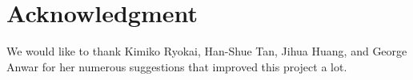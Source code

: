 \section{Acknowledgment}\label{sec:ack}
We would like to thank Kimiko Ryokai, Han-Shue Tan, Jihua Huang, and George Anwar for her numerous suggestions that improved this project a lot.
